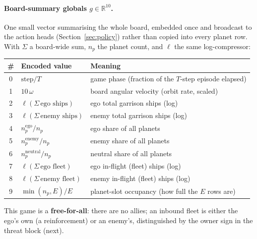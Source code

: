 \documentclass[11pt]{article}
\newcommand{\R}{\mathbb{R}}
\begin{document}
\paragraph{Board-summary globals $g\in\R^{10}$.} One small vector summarising the whole board,
embedded once and broadcast to the action heads (Section~\ref{sec:policy}) rather than copied into
every planet row. With $\Sigma$ a board-wide sum, $n_p$ the planet count, and $\ell$ the same
log-compressor:
\begin{center}\small
\begin{tabular}{@{}cll@{}}
\toprule
\# & Encoded value & Meaning \\
\midrule
0 & $\mathrm{step}/T$                   & game phase (fraction of the $T$-step episode elapsed) \\
1 & $10\,\omega$                        & board angular velocity (orbit rate, scaled) \\
2 & $\ell(\Sigma\,\text{ego ships})$    & ego total garrison ships (log) \\
3 & $\ell(\Sigma\,\text{enemy ships})$  & enemy total garrison ships (log) \\
4 & $n^{\mathrm{ego}}_p/n_p$            & ego share of all planets \\
5 & $n^{\mathrm{enemy}}_p/n_p$          & enemy share of all planets \\
6 & $n^{\mathrm{neutral}}_p/n_p$        & neutral share of all planets \\
7 & $\ell(\Sigma\,\text{ego fleet})$    & ego in-flight (fleet) ships (log) \\
8 & $\ell(\Sigma\,\text{enemy fleet})$  & enemy in-flight (fleet) ships (log) \\
9 & $\min(n_p,E)/E$                     & planet-slot occupancy (how full the $E$ rows are) \\
\bottomrule
\end{tabular}
\end{center}
This game is a \textbf{free-for-all}: there are no allies; an inbound fleet is either the ego's own
(a reinforcement) or an enemy's, distinguished by the owner sign in the threat block (next).
\end{document}

